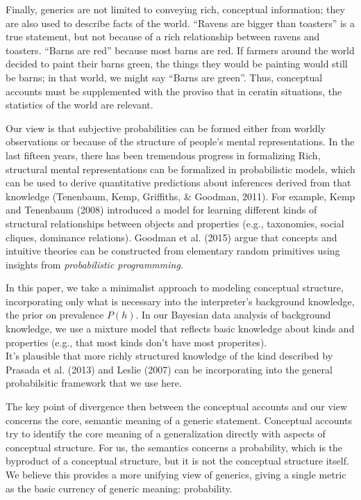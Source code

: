 \documentclass[english,floatsintext,man]{apa6}
\theoremstyle{definition}
\theoremstyle{definition}
\theoremstyle{definition}
\theoremstyle{remark}
\begin{document}
Finally, generics are not limited to conveying rich, conceptual
information; they are also used to describe facts of the world.
\enquote{Ravens are bigger than toasters} is a true statement, but not
because of a rich relationship between ravens and toasters.
\enquote{Barns are red} because most barns are red. If farmers around
the world decided to paint their barns green, the things they would be
painting would still be barns; in that world, we might say
\enquote{Barns are green}. Thus, conceptual accounts must be
supplemented with the proviso that in ceratin situations, the statistics
of the world are relevant.

Our view is that subjective probabilities can be formed either from
worldly observations or because of the structure of people's mental
representations. In the last fifteen years, there has been tremendous
progress in formalizing Rich, structural mental representations can be
formalized in probabilistic models, which can be used to derive
quantitative predictions about inferences derived from that knowledge
(Tenenbaum, Kemp, Griffiths, \& Goodman, 2011). For example, Kemp and
Tenenbaum (2008) introduced a model for learning different kinds of
structural relationships between objects and properties (e.g.,
taxonomies, social cliques, dominance relations). Goodman et al. (2015)
argue that concepts and intuitive theories can be constructed from
elementary random primitives using insights from \emph{probabilistic
programmming}.

In this paper, we take a minimalist approach to modeling conceptual
structure, incorporating only what is necessary into the interpreter's
background knowledge, the prior on prevalence \(P(h)\). In our Bayesian
data analysis of background knowledge, we use a mixture model that
reflects basic knowledge about kinds and properties (e.g., that most
kinds don't have most properites).\\
It's plausible that more richly structured knowledge of the kind
described by Prasada et al. (2013) and Leslie (2007) can be
incorporating into the general probabilsitic framework that we use here.

The key point of divergence then between the conceptual accounts and our
view concerns the core, semantic meaning of a generic statement.
Conceptual accounts try to identify the core meaning of a generalization
directly with aspects of conceptual structure. For us, the semantics
concerns a probability, which is the byproduct of a conceptual
structure, but it is not the conceptual structure itself. We believe
this provides a more unifying view of generics, giving a single metric
as the basic currency of generic meaning: probability.
\end{document}
